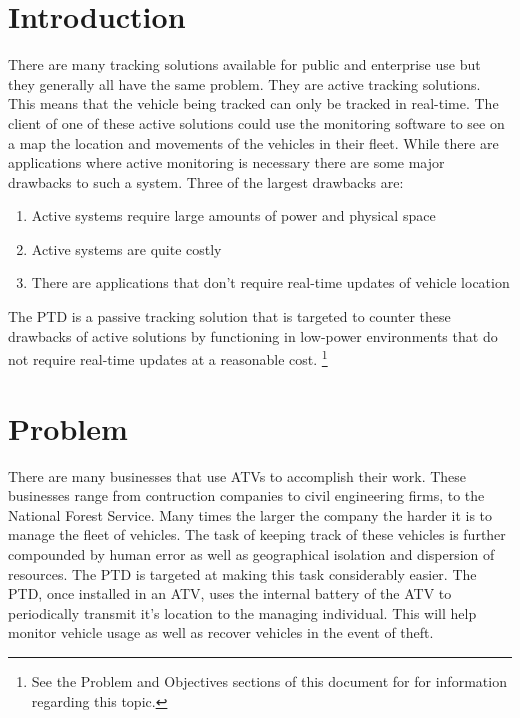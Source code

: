 \documentclass[11pt]{article}
\begin{document}
\section{Introduction}
There are many tracking solutions available for public and enterprise use but they generally all have the same problem. They are active tracking 
solutions. This means that the vehicle being tracked can only be tracked in real-time. The client of one of these active solutions could use the 
monitoring software to see on a map the location and movements of the vehicles in their fleet. While there are applications where 
active monitoring is necessary there are some major drawbacks to such a system. Three of the largest drawbacks are:
\begin{enumerate}
    \item Active systems require large amounts of power and physical space
    \item Active systems are quite costly
    \item There are applications that don't require real-time updates of vehicle location
\end{enumerate}
The PTD is a passive tracking solution that is targeted to counter these drawbacks of active solutions by functioning in low-power environments 
that do not require real-time updates at a reasonable cost. \footnote{See the Problem and Objectives sections of this document for for information 
regarding this topic.}


\section{Problem}
There are many businesses that use ATVs to accomplish their work. These businesses range from contruction companies to civil 
engineering firms, to the National Forest Service. Many times the larger the company the harder it is to manage the fleet of vehicles. The task of 
keeping track of these vehicles is further compounded by human error as well as geographical isolation and dispersion of resources. The PTD is 
targeted at making this task considerably easier. The PTD, once installed in an ATV, uses the internal battery of the ATV to periodically 
transmit it's location to the managing individual. This will help monitor vehicle usage as well as recover vehicles in the event of theft.
\end{document}
